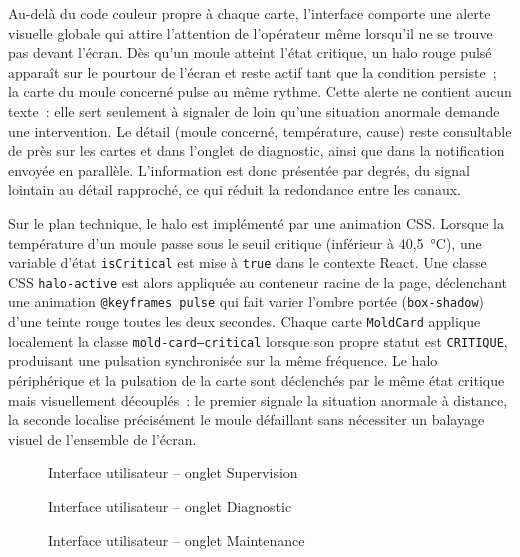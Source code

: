 Au-delà du code couleur propre à chaque carte, l'interface comporte une alerte visuelle globale qui attire l'attention de l'opérateur même lorsqu'il ne se trouve pas devant l'écran. Dès qu'un moule atteint l'état critique, un halo rouge pulsé apparaît sur le pourtour de l'écran et reste actif tant que la condition persiste~; la carte du moule concerné pulse au même rythme. Cette alerte ne contient aucun texte~: elle sert seulement à signaler de loin qu'une situation anormale demande une intervention. Le détail (moule concerné, température, cause) reste consultable de près sur les cartes et dans l'onglet de diagnostic, ainsi que dans la notification envoyée en parallèle. L'information est donc présentée par degrés, du signal lointain au détail rapproché, ce qui réduit la redondance entre les canaux.

Sur le plan technique, le halo est implémenté par une animation CSS. Lorsque la température d'un moule passe sous le seuil critique (inférieur à 40,5~\si{\celsius}), une variable d'état \texttt{isCritical} est mise à \texttt{true} dans le contexte React. Une classe CSS \texttt{halo-active} est alors appliquée au conteneur racine de la page, déclenchant une animation \texttt{@keyframes pulse} qui fait varier l'ombre portée (\texttt{box-shadow}) d'une teinte rouge toutes les deux secondes. Chaque carte \texttt{MoldCard} applique localement la classe \texttt{mold-card--critical} lorsque son propre statut est \texttt{CRITIQUE}, produisant une pulsation synchronisée sur la même fréquence. Le halo périphérique et la pulsation de la carte sont déclenchés par le même état critique mais visuellement découplés~: le premier signale la situation anormale à distance, la seconde localise précisément le moule défaillant sans nécessiter un balayage visuel de l'ensemble de l'écran.

\begin{figure}[htbp]
  \centering
  \caption{Interface utilisateur -- onglet Supervision}
  \label{fig:ui_supervision}
\end{figure}

\begin{figure}[htbp]
  \centering
  \caption{Interface utilisateur -- onglet Diagnostic}
  \label{fig:ui_diagnostic}
\end{figure}

\begin{figure}[htbp]
  \centering
  \caption{Interface utilisateur -- onglet Maintenance}
  \label{fig:ui_maintenance}
\end{figure}

